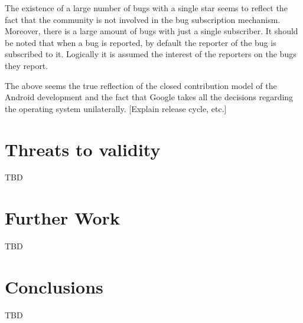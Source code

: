 \documentclass[10pt, conference, compsocconf]{IEEEtran}
\begin{document}
The existence of a large number of bugs with a single star seems to reflect the fact that the community is not involved in the bug subscription mechanism. Moreover, there is a large amount of bugs with just a single subscriber. It should be noted that when a bug is reported, by default the reporter of the bug is subscribed to it. Logically it is assumed the interest of the reporters on the bugs they report. 

The above seems the true reflection of the closed contribution model of the Android development and the fact that Google takes all the decisions regarding the operating system unilaterally. [Explain release cycle, etc.]

\section{Threats to validity}
TBD

\section{Further Work}
TBD

\section{Conclusions }
TBD


%
%
\end{document}
